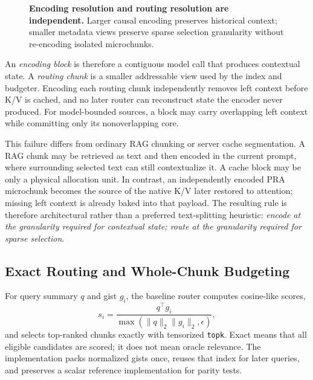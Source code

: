 \documentclass[11pt]{article}
\begin{document}
\begin{figure}[H]
\centering
{}
\caption{\textbf{Encoding resolution and routing resolution are independent.} Larger causal
encoding preserves historical context; smaller metadata views preserve sparse selection
granularity without re-encoding isolated microchunks.}
\label{fig:encoding-routing-granularity}
\end{figure}

An \emph{encoding block} is therefore a contiguous model call that produces contextual state.
A \emph{routing chunk} is a smaller addressable view used by the index and budgeter. Encoding
each routing chunk independently removes left context before K/V is cached, and no later router
can reconstruct state the encoder never produced. For model-bounded sources, a block may carry
overlapping left context while committing only its nonoverlapping core.

This failure differs from ordinary RAG chunking or server cache segmentation. A RAG chunk may be
retrieved as text and then encoded in the current prompt, where surrounding selected text can
still contextualize it. A cache block may be only a physical allocation unit. In contrast, an
independently encoded PRA microchunk becomes the source of the native K/V later restored to
attention; missing left context is already baked into that payload. The resulting rule is
therefore architectural rather than a preferred text-splitting heuristic: \emph{encode at the
granularity required for contextual state; route at the granularity required for sparse
selection}.

\subsection{Exact Routing and Whole-Chunk Budgeting}

For query summary $q$ and gist $g_i$, the baseline router computes cosine-like scores,
\begin{equation}
  s_i = \frac{q^\top g_i}{\max(\lVert q\rVert_2\lVert g_i\rVert_2,\epsilon)},
\end{equation}
and selects top-ranked chunks exactly with tensorized \texttt{topk}. Exact means that all
eligible candidates are scored; it does not mean oracle relevance. The implementation
packs normalized gists once, reuses that index for later queries, and preserves a scalar
reference implementation for parity tests.
\end{document}
